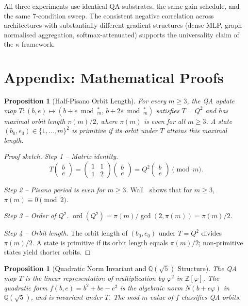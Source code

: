 \documentclass[11pt]{article}
\newtheorem{proposition}[theorem]{Proposition}
\theoremstyle{definition}
\theoremstyle{remark}
\newcommand{\Zfi}{\mathbb{Z}[\varphi]}
\newcommand{\Qfi}{\mathbb{Q}(\sqrt{5})}
\begin{document}
All three experiments use identical QA substrates, the same gain schedule, and the
same 7-condition sweep.  The consistent negative correlation across architectures
with substantially different gradient structures (dense MLP, graph-normalised
aggregation, softmax-attenuated) supports the universality claim of the $\kappa$
framework.

\section{Appendix: Mathematical Proofs}
\label{sec:appendix}
\setcounter{theorem}{0}

\begin{proposition}[Half-Pisano Orbit Length]
\label{prop:half-pisano}
For every $m\geq 3$, the QA update map
$T:(b,e)\mapsto(b{+}e\bmod_m^*,\,b{+}2e\bmod_m^*)$ satisfies $T=Q^2$ and has
maximal orbit length $\pi(m)/2$, where $\pi(m)$ is even for all $m\geq 3$.
A state $(b_0,e_0)\in\{1,\ldots,m\}^2$ is \emph{primitive} if its orbit under $T$
attains this maximal length.
\end{proposition}

\begin{proof}[Proof sketch]
\textit{Step 1 -- Matrix identity.}
\[
  T\begin{pmatrix}b\\e\end{pmatrix}
  = \begin{pmatrix}1&1\\1&2\end{pmatrix}\begin{pmatrix}b\\e\end{pmatrix}
  = Q^2\begin{pmatrix}b\\e\end{pmatrix}\pmod{m}.
\]

\textit{Step 2 -- Pisano period is even for $m\geq 3$.}
Wall~\cite{wall1960} shows that for $m\geq 3$, $\pi(m)\equiv 0\pmod{2}$.

\textit{Step 3 -- Order of $Q^2$.}
$\operatorname{ord}(Q^2)=\pi(m)/\gcd(2,\pi(m))=\pi(m)/2$.

\textit{Step 4 -- Orbit length.}
The orbit length of $(b_0,e_0)$ under $T=Q^2$ divides $\pi(m)/2$. A state is
primitive if its orbit length equals $\pi(m)/2$; non-primitive states yield shorter
orbits.
\end{proof}

\begin{proposition}[Quadratic Norm Invariant and $\mathbb{Q}(\sqrt{5})$ Structure]
\label{prop:norm-invariant}
The QA map $T$ is the linear representation of multiplication by $\varphi^2$ in
$\Zfi$. The quadratic form $f(b,e)=b^2+be-e^2$ is the algebraic norm
$N(b+e\varphi)$ in $\Qfi$, and is invariant under $T$. The mod-$m$ value of $f$
classifies QA orbits.
\end{proposition}
\end{document}

